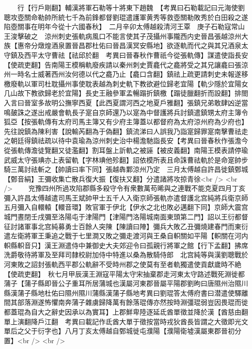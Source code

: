 　　行【行戶剛翻】輔漢將軍石勒等十將東下趙魏　【考異曰石勒載記曰元海使劉聰攻壺關命勒帥所統七千為前鋒都督劉琨遣護軍黄秀等救壺關勒敗秀於白田殺之遂陷壺關事在明年今從十六國春秋】　二月辛卯太傅越殺清河王覃　庚子石勒寇常山王浚擊破之　涼州刺史張軌病風口不能言使其子茂攝州事隴西内史晉昌張越涼州大族【惠帝分燉煌酒泉置晉昌郡杜佑曰晉昌漢冥安縣地】欲逐軌而代之與其兄酒泉太守鎮及西平太守曹祛【祛邱於翻　考異曰晉春秋作曹祇今從張軌傳】謀遣使詣長安【使疏吏翻】告南陽王模稱軌廢疾請以秦州刺史賈龕代之龕將受之其兄讓龕曰張涼州一時名士威著西州汝何德以代之龕乃止【龕口含翻】鎮祛上疏更請刺史未報遂移檄廢軌以軍司杜耽攝州事使耽表越為刺史軌下教欲避位歸老宜陽【軌少隱於宜陽女几山故下教欲歸老於宜陽】長史王融參軍孟暢蹋折鎮檄【蹋徒臘翻折而設翻】排閤入言曰晉室多故明公撫寧西夏【此西夏謂河西之地夏戶雅翻】張鎮兄弟敢肆凶逆當鳴皷誅之遂出戒嚴會軌長子寔自京師還乃以寔為中督護將兵討鎮遣鎮甥太府主簿令狐亞【按張軌傳有太府司馬主簿又有少府主簿蓋以都督府為太府涼州府為少府也】先往說鎮為陳利害【說輸芮翻為于偽翻】鎮流涕曰人誤我乃詣寔歸罪寔南擊曹祛走之朝廷得鎮祛疏以待中袁瑜為涼州刺史治中楊澹馳詣長安【考異曰晉春秋作張澹今從張軌傳澹徒覽翻又徒濫翻】割耳盤上訢軌之被誣【被皮義翻】南陽王模表請停瑜武威太守張琠亦上表留軌【字林琠他殄翻】詔依模所表且命誅曹祛軌於是命寔帥步騎三萬討祛斬之【帥讀曰率下同】張越犇鄴涼州乃定　三月太傅越自許昌徙鎮鄄城【鄄音絹】王彌收集亡散兵復大振【復扶又翻】分遣諸將攻掠青徐<br />
<br />
　　兖豫四州所過攻陷郡縣多殺守令有衆數萬苟晞與之連戰不能克夏四月丁亥彌入許昌太傅越遣司馬王斌帥甲士五千人入衛京師張軌亦遣督護北宫純將兵衛京師五月彌入自轘轅【轘音環】敗官軍于伊北【伊水之北也敗必邁翻下同】京師大震宫城門晝閉壬戌彌至洛陽屯于津陽門【津陽門洛陽城南面東頭第二門】詔以王衍都督征討諸軍事北宫純募勇士百餘人突陳【陳讀曰陣】彌兵大敗乙丑彌燒建春門而東衍遣左衛將軍王秉追之戰于七里澗又敗之彌走渡河與王桑自軹關如平陽【軹關在河内軹縣軹音只】漢王淵遣侍中兼御史大夫郊迎令曰孤親行將軍之館【行下孟翻】拂席洗爵敬待將軍及至拜司隸校尉加侍中特進以桑為散騎侍郎　北宫純等與漢劉聰戰於河東敗之詔封張軌西平郡公軌辭不受時州郡之使莫有至者軌獨遣使貢獻歲時不絶【使疏吏翻】　秋七月甲辰漢王淵寇平陽太守宋抽棄郡走河東太守路述戰死淵徙都蒲子【蒲子縣即晉公子重耳所居蒲城也漢屬河東郡晉屬平陽郡劉昫曰唐隰州治隰川縣漢蒲子縣地杜佑曰隰州隰川蒲縣漢蒲子縣地考異曰劉琨答太傅府書曰潜遣使驛離間其部落淵遂怖懼南奔蒲子雜虜歸降萬有餘落琨傳亦然按時淵彊琨弱豈因畏琨而徙都蓋琨為自大之辭史因承以為實耳】上郡鮮卑陸逐延氐酋單徵並降於漢【酋慈由翻單上演翻降戶江翻　考異曰載記作氐酋大單于徵按當時戎狄酋長皆謂之大徵即光文單后之父于衍字也】八月丁亥太傅越自鄄城徙屯濮陽【濮陽衛墟漢屬東郡晉初分置】<br />
<br />
